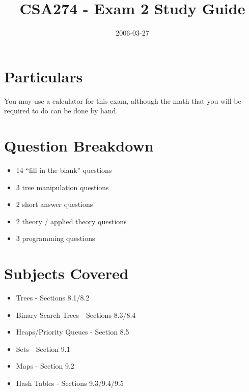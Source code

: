 \documentclass[10pt]{article}
\title{CSA274 - Exam 2 Study Guide}
\author{}
\date{2006-03-27}
\newif\ifpdf
\begin{document}

\ifpdf
\DeclareGraphicsExtensions{.pdf, .jpg, .tif}
\else
{}
\fi

\maketitle

\section{Particulars}
You may use a calculator for this exam, although the math that you will be required to do can be done by hand.

\section{Question Breakdown}
\begin{itemize}
	\item 14 ``fill in the blank'' questions
	\item 3 tree manipulation questions
	\item 2 short answer questions
	\item 2 theory / applied theory questions
	\item 3 programming questions
\end{itemize}

\section{Subjects Covered}
\begin{itemize}
	\item Trees - Sections 8.1/8.2
	\item Binary Search Trees - Sections 8.3/8.4
	\item Heaps/Priority Queues - Section 8.5
	\item Sets - Section 9.1
	\item Maps - Section 9.2
	\item Hash Tables - Sections 9.3/9.4/9.5
\end{itemize}
\end{document}
